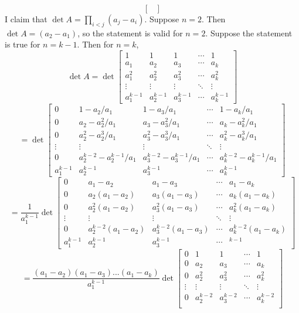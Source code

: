 \documentclass[12pt]{article}
\begin{document}
\begin{itemize}
\begin{itemize}
$$\begin{bmatrix}
\end{bmatrix}$$
I claim that $\det A = \prod_{i < j}(a_j - a_i)$. Suppose $n = 2$. Then $\det A = (a_2 - a_1)$, so the statement is valid for $n = 2$. Suppose the statement is true for $n = k - 1$. Then for $n = k$,
$$\det A = \det\begin{bmatrix}
1 & 1 & 1 & \cdots & 1 \\
a_1 & a_2 & a_3 & \cdots & a_k \\
a_1^2 & a_2^2 & a_3^2 & \cdots & a_k^2 \\
\vdots & \vdots & \vdots & \ddots & \vdots \\
a_1^{k-1} & a_2^{k-1} & a_3^{k-1} & \cdots & a_k^{k-1}
\end{bmatrix}$$ 
$$= \det\begin{bmatrix}
0 & 1 - a_2/a_1 & 1 - a_3/a_1 & \cdots & 1 - a_k/a_1 \\
0 & a_2 - a_2^2/a_1 & a_3 - a_3^2/a_1 & \cdots & a_k - a_k^2/a_1 \\
0 & a_2^2 - a_2^3/a_1 & a_3^2 - a_3^3/a_1 & \cdots & a_k^2 - a_k^3/a_1 \\
\vdots & \vdots & \vdots & \ddots & \vdots \\
0 & a_2^{k-2} - a_2^{k-1}/a_1 & a_3^{k-2} - a_3^{k-1}/a_1 & \cdots & a_k^{k-2} - a_k^{k-1}/a_1 \\
a_1^{k-1} & a_2^{k-1} & a_3^{k-1} & \cdots & a_k^{k-1}
\end{bmatrix}$$
$$= \frac{1}{a_1^{k-1}}\det\begin{bmatrix}
0 & a_1 - a_2 & a_1 - a_3 & \cdots & a_1 - a_k \\
0 & a_2(a_1 - a_2) & a_3(a_1 - a_3) & \cdots & a_k(a_1 - a_k) \\
0 & a_2^2(a_1 - a_2) & a_3^2(a_1 - a_3) & \cdots & a_k^2(a_1 - a_k) \\
\vdots & \vdots & \vdots & \ddots & \vdots \\
0 & a_2^{k-2}(a_1 - a_2) & a_3^{k-2}(a_1 - a_3) & \cdots & a_k^{k-2}(a_1 - a_k) \\
a_1^{k-1} & a_2^{k-1} & a_3^{k-1} & \cdots & ^{k-1}
\end{bmatrix}$$
$$= \frac{(a_1 - a_2)(a_1 - a_3)...(a_1 - a_k)}{a_1^{k-1}}\det\begin{bmatrix}
0 & 1 & 1 & \cdots & 1 \\
0 & a_2 & a_3 & \cdots & a_k \\
0 & a_2^2 & a_3^2 & \cdots & a_k^2 \\
\vdots & \vdots & \vdots & \ddots & \vdots \\
0 & a_2^{k-2} & a_3^{k-2} & \cdots & a_k^{k-2} \\

\end{bmatrix}$$
\end{itemize}
\end{itemize}
\end{document}
